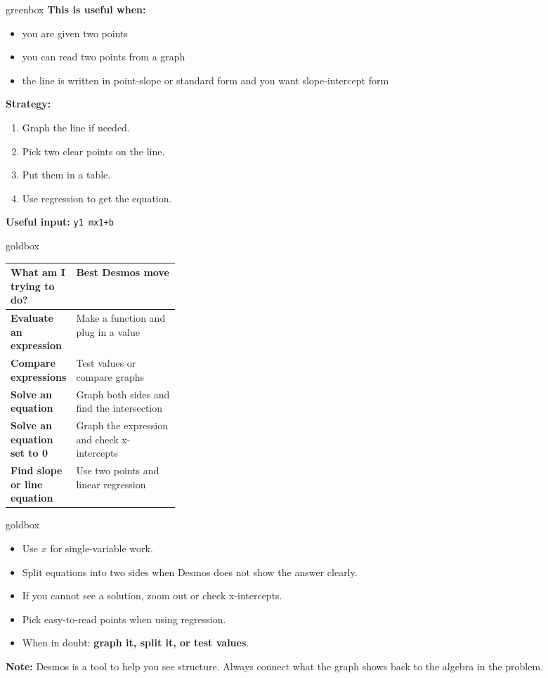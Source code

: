 \documentclass[11pt]{article}
\newcommand{\code}[1]{\texttt{#1}}
\begin{document}
\begin{multicols}{2}
\begin{skillbox}{greenbox}
\textbf{This is useful when:}
\begin{itemize}
  \item you are given two points
  \item you can read two points from a graph
  \item the line is written in point-slope or standard form and you want slope-intercept form
\end{itemize}

\textbf{Strategy:}
\begin{enumerate}
  \item Graph the line if needed.
  \item Pick two clear points on the line.
  \item Put them in a table.
  \item Use regression to get the equation.
\end{enumerate}

\textbf{Useful input:} \code{y1~mx1+b}
\end{skillbox}

\begin{skillbox}{goldbox}
\begin{tabularx}{\linewidth}{>{\bfseries}p{0.28\linewidth} X}
What am I trying to do? & Best Desmos move \\
\hline
Evaluate an expression & Make a function and plug in a value \\
\hline
Compare expressions & Test values or compare graphs \\
\hline
Solve an equation & Graph both sides and find the intersection \\
\hline
Solve an equation set to 0 & Graph the expression and check x-intercepts \\
\hline
Find slope or line equation & Use two points and linear regression \\
\end{tabularx}\end{skillbox}

\begin{skillbox}{goldbox}
\begin{itemize}
  \item Use \textbf{$x$} for single-variable work.
  \item Split equations into two sides when Desmos does not show the answer clearly.
  \item If you cannot see a solution, zoom out or check x-intercepts.
  \item Pick easy-to-read points when using regression.
  \item When in doubt: \textbf{graph it, split it, or test values}. 
\end{itemize}
\end{skillbox}

\end{multicols}

\vspace{0.4em}
{\small\textbf{Note:} Desmos is a tool to help you see structure. Always connect what the graph shows back to the algebra in the problem.}
\end{document}
